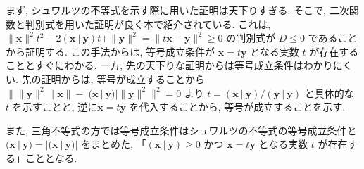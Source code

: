 まず, シュワルツの不等式を示す際に用いた証明は天下りすぎる. そこで, 二次関数と判別式を用いた証明が良く本で紹介されている.
これは, $\|\bm{x}\|^2t^2 - 2(\bm{x}\ |\ \bm{y})t + \|\bm{y}\|^2 = \| t\bm{x} - \bm{y}\|^2 \geq 0$ の判別式が $D \leq 0$ であることから証明する.
この手法からは, 等号成立条件が $\bm{x} = t\bm{y}$ となる実数 $t$ が存在することとすぐにわかる. 一方, 先の天下りな証明からは等号成立条件はわかりにくい.
先の証明からは, 等号が成立することから $\| \|\bm{y}\|^2\|\bm{x}\| - |(\bm{x}\ |\ \bm{y})| \|\bm{y}\|^2 \|^2 = 0$ より $t = (\bm{x}\ |\ \bm{y})/(\bm{y}\ |\ \bm{y})$ と具体的な $t$ を示すことと, 
逆に$\bm{x} = t\bm{y}$ を代入することから, 等号が成立することを示す. 

また, 三角不等式の方では等号成立条件はシュワルツの不等式の等号成立条件と $(\bm{x}\ |\ \bm{y}) = |(\bm{x}\ |\ \bm{y})|$ をまとめた, 
「$(\bm{x}\ |\ \bm{y}) \geq 0$ かつ $\bm{x} = t\bm{y}$ となる実数 $t$ が存在する」こととなる.


